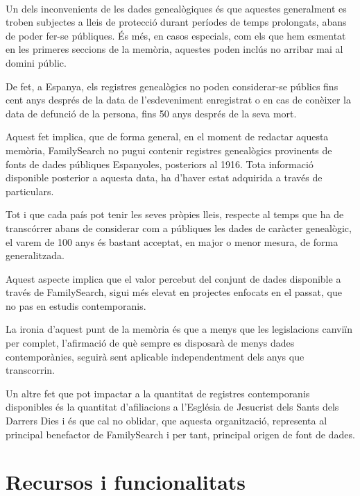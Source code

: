     \paragraph{}
    Un dels inconvenients de les dades genealògiques és que aquestes generalment es troben subjectes a lleis de protecció durant períodes de temps prolongats, abans de poder fer-se públiques. És més, en casos especials, com els que hem esmentat en les primeres seccions de la memòria, aquestes poden inclús no arribar mai al domini públic.

    De fet, a Espanya, els registres genealògics no poden considerar-se públics fins cent anys després de la data de l'esdeveniment enregistrat o en cas de conèixer la data de defunció de la persona, fins 50 anys després de la seva mort.

    Aquest fet implica, que de forma general, en el moment de redactar aquesta memòria, FamilySearch no pugui contenir re\-gis\-tres genealògics provinents de fonts de dades públiques Espanyoles, posteriors al 1916. Tota informació disponible posterior a aquesta data, ha d'haver estat adquirida a través de particulars.

    Tot i que cada país pot tenir les seves pròpies lleis, respecte al temps que ha de transcórrer abans de considerar com a públiques les dades de caràcter genealògic, el varem de 100 anys és bastant acceptat, en major o menor mesura, de forma generalitzada.

    Aquest aspecte implica que el valor percebut del conjunt de dades disponible a través de FamilySearch, sigui més elevat en projectes enfocats en el passat, que no pas en estudis contemporanis.

    La ironia d'aquest punt de la memòria és que a menys que les legislacions canviïn per complet, l'afirmació de què sempre es disposarà de menys dades contemporànies, seguirà sent aplicable independentment dels anys que transcorrin.

    Un altre fet que pot impactar a la quantitat de registres contemporanis disponibles és la quantitat d'afiliacions a l'Església de Jesucrist dels Sants dels Darrers Dies i és que cal no oblidar, que aquesta organització, representa al principal benefactor de FamilySearch i per tant, principal origen de font de dades.


\section{Recursos i funcionalitats}

